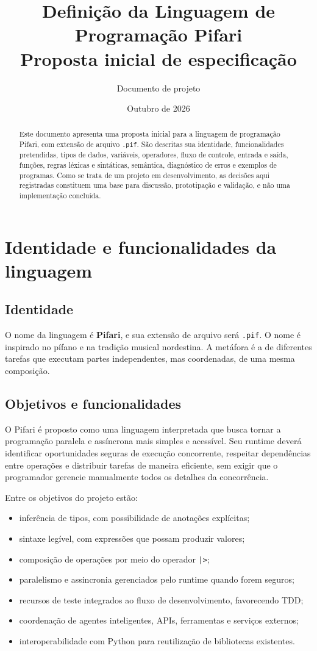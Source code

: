 \documentclass[12pt,a4paper]{article}
\title{\textbf{Definição da Linguagem de Programação Pifari}\\
\large Proposta inicial de especificação}
\author{Documento de projeto}
\date{Outubro de 2026}
\begin{document}
\maketitle
\begin{abstract}
Este documento apresenta uma proposta inicial para a linguagem de programação Pifari, com extensão de arquivo \texttt{.pif}. São descritas sua identidade, funcionalidades pretendidas, tipos de dados, variáveis, operadores, fluxo de controle, entrada e saída, funções, regras léxicas e sintáticas, semântica, diagnóstico de erros e exemplos de programas. Como se trata de um projeto em desenvolvimento, as decisões aqui registradas constituem uma base para discussão, prototipação e validação, e não uma implementação concluída.
\end{abstract}
\tableofcontents
\newpage

\section{Identidade e funcionalidades da linguagem}
\subsection{Identidade}
O nome da linguagem é \textbf{Pifari}, e sua extensão de arquivo será \texttt{.pif}. O nome é inspirado no pífano e na tradição musical nordestina. A metáfora é a de diferentes tarefas que executam partes independentes, mas coordenadas, de uma mesma composição.

\subsection{Objetivos e funcionalidades}
O Pifari é proposto como uma linguagem interpretada que busca tornar a programação paralela e assíncrona mais simples e acessível. Seu runtime deverá identificar oportunidades seguras de execução concorrente, respeitar dependências entre operações e distribuir tarefas de maneira eficiente, sem exigir que o programador gerencie manualmente todos os detalhes da concorrência.

Entre os objetivos do projeto estão:
\begin{itemize}
\item inferência de tipos, com possibilidade de anotações explícitas;
\item sintaxe legível, com expressões que possam produzir valores;
\item composição de operações por meio do operador \texttt{|>};
\item paralelismo e assincronia gerenciados pelo runtime quando forem seguros;
\item recursos de teste integrados ao fluxo de desenvolvimento, favorecendo TDD;
\item coordenação de agentes inteligentes, APIs, ferramentas e serviços externos;
\item interoperabilidade com Python para reutilização de bibliotecas existentes.
\end{itemize}
\end{document}
